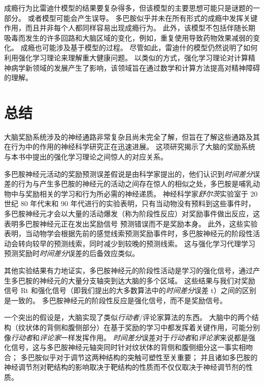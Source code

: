 成瘾行为比雷迪什模型的结果要复杂得多，但该模型的主要思想可能只是谜题的一部分。
或者模型可能会产生误导。
多巴胺似乎并未在所有形式的成瘾中发挥关键作用，而且并非每个人都同样容易出现成瘾行为。
此外，该模型不包括伴随长期吸毒而发生的许多回路和大脑区域的变化，例如，重复使用导致药物效果减弱的变化。
成瘾也可能涉及基于模型的过程。
尽管如此，雷迪什的模型仍然说明了如何利用强化学习理论来理解重大健康问题。
以类似的方式，强化学习理论对计算精神病学新领域的发展产生了影响，该领域旨在通过数学和计算方法提高对精神障碍的理解。


\section{总结}

大脑奖励系统涉及的神经通路非常复杂且尚未完全了解，但旨在了解这些通路及其在行为中的作用的神经科学研究正在迅速进展。
这项研究揭示了大脑的奖励系统与本书中提出的强化学习理论之间惊人的对应关系。


多巴胺神经元活动的奖励预测误差假说是由科学家提出的，他们认识到\textit{时间差分}误差的行为与产生多巴胺的神经元的活动之间存在惊人的相似之处，多巴胺是哺乳动物中与奖励相关的学习和行为所必需的神经递质。
神经科学家\textit{舒尔茨}实验室于 20 世纪 80 年代末和 90 年代进行的实验表明，只有当动物没有预料到这些事件时，多巴胺神经元才会以大量的活动爆发（称为阶段性反应）对奖励事件做出反应，这表明多巴胺神经元正在发出奖励信号 预测错误而不是奖励本身。
此外，这些实验表明，当动物学会根据先前的感觉线索预测奖励事件时，多巴胺神经元的阶段性活动会转向较早的预测线索，同时减少到较晚的预测线索。
这与强化学习代理学习预测奖励时\textit{时间差分}误差的后备效应类似。


其他实验结果有力地证实，多巴胺神经元的阶段性活动是学习的强化信号，通过产生多巴胺的神经元的大量分支轴突到达大脑的多个区域。
这些结果与我们对奖励信号 Rt 和强化信号（即我们提出的大多数算法中的\textit{时间差分}误差 t）之间的区别是一致的。
多巴胺神经元的阶段性反应是强化信号，而不是奖励信号。


一个突出的假设是，大脑实现了类似\textit{行动者}/评论家算法的东西。
大脑中的两个结构（纹状体的背侧和腹侧部分）在基于奖励的学习中都发挥着关键作用，可能分别像\textit{行动者}和\textit{评论家}一样发挥作用。
\textit{时间差分}误差对于\textit{行动者}和\textit{评论家}来说都是强化信号，这与多巴胺神经元轴突同时针对纹状体的背侧和腹侧细分这一事实相吻合；
多巴胺似乎对于调节这两种结构的突触可塑性至关重要；
并且诸如多巴胺的神经调节剂对靶结构的影响取决于靶结构的性质而不仅仅取决于神经调节剂的性质。



